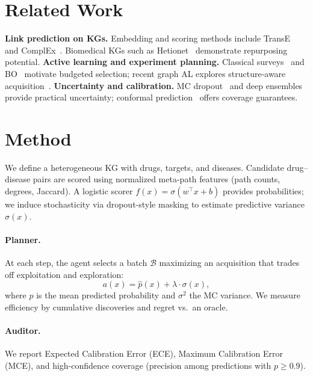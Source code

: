 \documentclass{article}
\begin{document}
\section{Related Work}
\textbf{Link prediction on KGs.} Embedding and scoring methods include TransE~\cite{bordes2013translating} and ComplEx~\cite{trouillon2016complex}. Biomedical KGs such as Hetionet~\cite{himmelstein2017hetionet} demonstrate repurposing potential. \textbf{Active learning and experiment planning.} Classical surveys~\cite{settles2009active} and BO~\cite{snoek2012practical} motivate budgeted selection; recent graph AL explores structure-aware acquisition~\cite{huang2018active,ma2021active}. \textbf{Uncertainty and calibration.} MC dropout~\cite{gal2016dropout} and deep ensembles~\cite{lakshminarayanan2017simple} provide practical uncertainty; conformal prediction~\cite{shafer2008conformal} offers coverage guarantees.

\section{Method}
We define a heterogeneous KG with drugs, targets, and diseases. Candidate drug--disease pairs are scored using normalized meta-path features (path counts, degrees, Jaccard). A logistic scorer $f(x)=\sigma(w^\top x + b)$ provides probabilities; we induce stochasticity via dropout-style masking to estimate predictive variance $\sigma(x)$.

\paragraph{Planner.} At each step, the agent selects a batch $\mathcal{B}$ maximizing an acquisition that trades off exploitation and exploration:
\begin{equation}
a(x) = \hat{p}(x) + \lambda \cdot \sigma(x),
\end{equation}
where $\hat{p}$ is the mean predicted probability and $\sigma^2$ the MC variance. We measure efficiency by cumulative discoveries and regret vs.\ an oracle.

\paragraph{Auditor.} We report Expected Calibration Error (ECE), Maximum Calibration Error (MCE), and high-confidence coverage (precision among predictions with $p \ge 0.9$).
\end{document}
